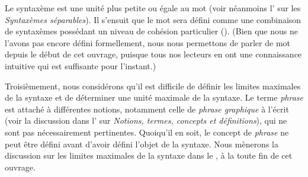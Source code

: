 Le syntaxème est une unité plus petite ou égale au mot (voir néanmoins l’ sur les \textit{Syntaxèmes séparables}). Il s’ensuit que le mot sera défini comme une combinaison de syntaxèmes possédant un niveau de cohésion particulier (). (Bien que nous ne l’avons pas encore défini formellement, nous nous permettons de parler de mot depuis le début de cet ouvrage, puisque tous nos lecteurs en ont une connaissance intuitive qui est suffisante pour l’instant.)

Troisièmement, nous considérons qu'il est difficile de définir les limites maximales de la syntaxe et de déterminer une unité maximale de la syntaxe. Le terme \textit{phrase} est attaché à différentes notions, notamment celle de \textit{phrase graphique} à l'écrit (voir la discussion dans l' sur \textit{Notions, termes, concepts et définitions}), qui ne sont pas nécessairement pertinentes. Quoiqu'il en soit, le concept de \textit{phrase} ne peut être défini avant d'avoir défini l'objet de la syntaxe. Nous mènerons la discussion sur les limites maximales de la syntaxe dans le , à la toute fin de cet ouvrage.

